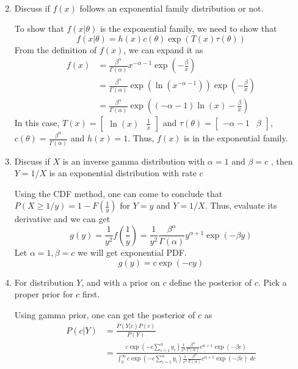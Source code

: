 \documentclass{article}
\begin{document}
\begin{enumerate}
\begin{sol}
\begin{align*}
    \end{align*}
    \end{sol}
    \color{black}
    \item Discuss if $f(x)$ follows an exponential family distribution or not. 
    \color{blue}
    \begin{sol}
    To show that $f(x|\theta)$ is the exponential family, we need to show that
    $$f(x|\theta) = h(x)c(\theta) \exp(T(x)\tau(\theta))$$
    From the definition of $f(x)$, we can expand it as
    \begin{align*}
        f(x) &= \frac{\beta^\alpha}{\Gamma(\alpha)} x^{-\alpha-1}\exp\left(-\frac{\beta}{x}\right) \\
        &= \frac{\beta^\alpha}{\Gamma(\alpha)}\exp\left(\ln(x^{-\alpha-1})\right)\exp\left(-\frac{\beta}{x}\right)\\
        &=  \frac{\beta^\alpha}{\Gamma(\alpha)} \exp\left((-\alpha-1)\ln(x) - \frac{\beta}{x}\right)
    \end{align*}
    In this case, $T(x) = \begin{bmatrix}\ln(x) & \frac{1}{x}\end{bmatrix}$ and $\tau(\theta) = \begin{bmatrix}
        -\alpha - 1 & \beta
    \end{bmatrix}$, $c(\theta) =\frac{\beta^\alpha}{\Gamma(\alpha)}$ and $h(x) = 1$. Thus, $f(x)$ is in the exponential family.
    \end{sol}
    \color{black}
    \item Discuss if $X$ is an inverse gamma distribution with $\alpha =1$  and $\beta =c$ , then $Y=1/X$ is an exponential distribution with rate $c$ 
    \color{blue}
    \begin{sol}
        Using the CDF method, one can come to conclude that $P(X\geq 1/y) = 1-F(\frac{1}{y})$ for $Y = y$ and $Y = 1/X$. Thus, evaluate its derivative and we can get
        $$g(y) = \frac{1}{y^2}f\left(\frac{1}{y}\right) = \frac{1}{y^2}\frac{\beta^\alpha}{\Gamma(\alpha)}y^{\alpha+1}\exp\left(-\beta y\right)$$
        Let $\alpha = 1, \beta = c$ we will get exponential PDF.
        $$g(y) = c\exp(-cy)$$
    \end{sol}
    \color{black}
    \item For distribution $Y$, and with a prior on $c$ define the posterior of $c$. Pick a proper prior for $c$ 
first. 
\color{blue}
\begin{sol}
    Using gamma prior, one can get the posterior of $c$ as
    \begin{align*}
        P(c|Y) &= \frac{P(Y|c)P(c)}{P(Y)} \\
        &= \frac{c\exp\left(-c\sum_{i=1}^n y_i\right)\frac{1}{c^2}\frac{\beta^\alpha}{\Gamma(\alpha)}c^{\alpha+1}\exp\left(-\beta c\right)}{\int_{0}^{\infty} c\exp\left(-c\sum_{i=1}^n y_i\right)\frac{1}{c^2}\frac{\beta^\alpha}{\Gamma(\alpha)}c^{\alpha+1}\exp\left(-\beta c\right)\; dc}
    \end{align*}
\end{sol}
\color{black}
\end{enumerate}
\end{document}

